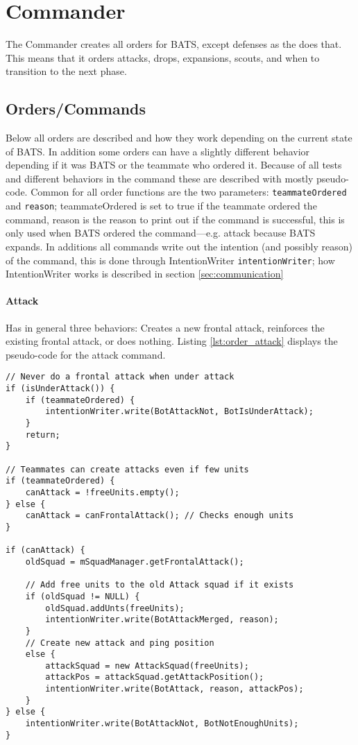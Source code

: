 \section{Commander}
\label{sec:Commander}
The Commander creates all orders for BATS, except defenses as the  does that. This means that it orders attacks, drops, expansions, scouts, and when to transition to the next phase.

\subsection{Orders/Commands}
Below all orders are described and how they work depending on the current state of BATS. In addition some orders can have a slightly different behavior depending if it was BATS or the teammate who ordered it. Because of all tests and different behaviors in the command these are described with mostly pseudo-code. Common for all order functions are the two parameters: \texttt{teammateOrdered} and \texttt{reason}; teammateOrdered is set to true if the teammate ordered the command, reason is the reason to print out if the command is successful, this is only used when BATS ordered the command—e.g. attack because BATS expands. In additions all commands write out the intention (and possibly reason) of the command, this is done through IntentionWriter \texttt{intentionWriter}; how IntentionWriter works is described in section \ref{sec:communication}

\paragraph{Attack}
Has in general three behaviors: Creates a new frontal attack, reinforces the existing frontal attack, or does nothing. Listing \ref{lst:order_attack} displays the pseudo-code for the attack command.
\begin{lstlisting}[label={lst:order_attack},caption={Pseudo-code for the attack command}]
// Never do a frontal attack when under attack
if (isUnderAttack()) {
	if (teammateOrdered) {
		intentionWriter.write(BotAttackNot, BotIsUnderAttack);
	}
	return;
}

// Teammates can create attacks even if few units
if (teammateOrdered) {
	canAttack = !freeUnits.empty();
} else {
	canAttack = canFrontalAttack(); // Checks enough units
}

if (canAttack) {
	oldSquad = mSquadManager.getFrontalAttack();
	
	// Add free units to the old Attack squad if it exists
	if (oldSquad != NULL) {
		oldSquad.addUnts(freeUnits);
		intentionWriter.write(BotAttackMerged, reason);
	}
	// Create new attack and ping position
	else {
		attackSquad = new AttackSquad(freeUnits);
		attackPos = attackSquad.getAttackPosition();
		intentionWriter.write(BotAttack, reason, attackPos);
	}
} else {
	intentionWriter.write(BotAttackNot, BotNotEnoughUnits);
}
\end{lstlisting}

